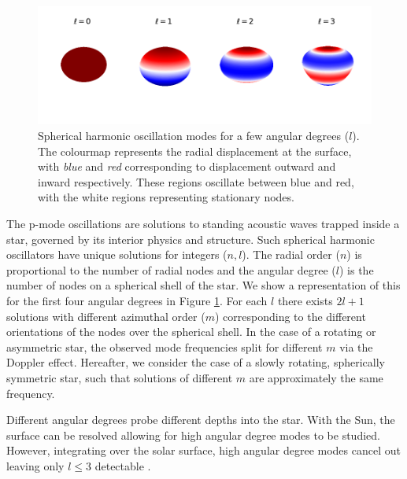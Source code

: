\begin{figure}[tb]
    \centering
    \includegraphics[trim={0 0.2in 0 0},clip]{figures/spherical_harmonics.pdf}
    \caption{Spherical harmonic oscillation modes for a few angular degrees ($l$). The colourmap represents the radial displacement at the surface, with \emph{blue} and \emph{red} corresponding to displacement outward and inward respectively. These regions oscillate between blue and red, with the white regions representing stationary nodes.}
    \label{fig:spherical-harmonics}
\end{figure}

The p-mode oscillations are solutions to standing acoustic waves trapped inside a star, governed by its interior physics and structure. Such spherical harmonic oscillators have unique solutions for integers (\(n, l\)). The radial order (\(n\)) is proportional to the number of radial nodes and the angular degree (\(l\)) is the number of nodes on a spherical shell of the star. We show a representation of this for the first four angular degrees in Figure \ref{fig:spherical-harmonics}. For each \(l\) there exists \(2l+1\) solutions with different azimuthal order (\(m\)) corresponding to the different orientations of the nodes over the spherical shell. In the case of a rotating or asymmetric star, the observed mode frequencies split for different \(m\) via the Doppler effect. Hereafter, we consider the case of a slowly rotating, spherically symmetric star, such that solutions of different \(m\) are approximately the same frequency.

Different angular degrees probe different depths into the star. With the Sun, the surface can be resolved allowing for high angular degree modes to be studied. However, integrating over the solar surface, high angular degree modes cancel out leaving only \(l \leq 3\) detectable \needcite.

